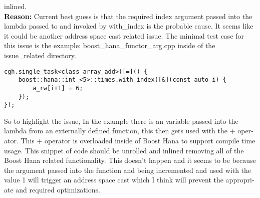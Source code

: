 \begin{otherlanguage}{english}
                                         inlined.\\
                                         \textbf{Reason:} Current best guess is
                                         that the required index argument passed
                                         into the lambda passed to and invoked
                                         by with\_index is the probable cause.
                                         It seems like it could be another
                                         address space cast related issue. The
                                         minimal test case for this issue is
                                         the example:
                                         boost\_hana\_functor\_arg.cpp inside of
                                         the issue\_related directory.
                                         \begin{code}
                                             \begin{verbatim}
cgh.single_task<class array_add>([=]() {
    boost::hana::int_<5>::times.with_index([&](const auto i) {
        a_rw[i+1] = 6;
    });
});
                                             \end{verbatim}
                                         \end{code}
                                         So to highlight the issue, In the
                                         example there is an variable passed
                                         into the lambda from an externally
                                         defined function, this then gets used
                                         with the + operator. This + operator is
                                         overloaded inside of Boost Hana to
                                         support compile time usage. This
                                         snippet of code should be unrolled and
                                         inlined removing all of the Boost Hana
                                         related functionality. This doesn't
                                         happen and it seems to be because the
                                         argument passed into the function and
                                         being incremented and used with the
                                         value 1 will trigger an address space
                                         cast which I think will prevent the
                                         appropriate and required optimizations.

\end{otherlanguage}
